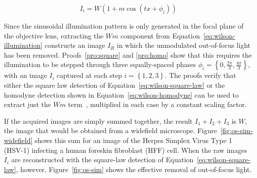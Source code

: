 \begin{equation} \label{eq:wilson-illumination}
I_i = W \left( 1 + m \cos \left(t x + \phi_i \right) \right)
\end{equation}

Since the sinusoidal illumination pattern is only generated in the focal plane of the objective lens, extracting the $Wm$ component from Equation~\ref{eq:wilson-illumination} constructs an image $I_R$ in which the unmodulated out-of-focus light has been removed.
Proofs~\ref{pro:square} and \ref{pro:homo} show that this requires the illumination to be stepped through three equally-spaced phases $\phi_i = \left\lbrace0, \frac{2\pi}{3}, \frac{4\pi}{3}\right\rbrace$, with an image $I_i$ captured at each step $i=\left\lbrace1,2,3\right\rbrace$.
The proofs verify that either the square law detection of Equation~\ref{eq:wilson-square-law} or the homodyne detection shown in Equation~\ref{eq:wilson-homodyne} can be used to extract just the $Wm$ term~\cite{neil1997method}, multiplied in each case by a constant scaling factor.

If the acquired images are simply summed together, the result $I_1+I_2+I_3$ is $W$, the image that would be obtained from a widefield microscope.
Figure~\ref{fig:os-sim-widefield} shows this sum for an image of the Herpes Simplex Virus Type 1 (HSV-1) infecting a human foreskin fibroblast (HFF) cell.
When the raw images $I_i$ are reconstructed with the square-law detection of Equation~\ref{eq:wilson-square-law}, however, Figure~\ref{fig:os-sim} shows the effective removal of out-of-focus light.

